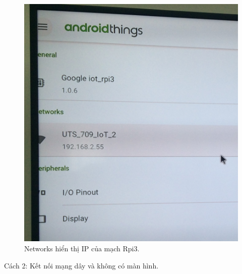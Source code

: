 \begin{enumerate}
\begin{center}
\begin{figure}[htp]
\begin{center}
\includegraphics[scale=0.17]{image3/buoc3s9.JPG}
\end{center}
\caption{Networks hiển thị IP của mạch Rpi3.}
\label{refhinh1}
\end{figure}
\end{center}
\end{enumerate}
\hspace*{0.25cm}Cách 2: Kết nối mạng dây và không có màn hình. 
